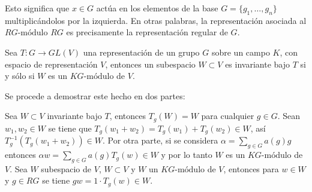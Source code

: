   Esto significa que $x \in G$ actúa en los elementos de la base $G = \{ g_1, \dots, g_n \}$ multiplicándolos por la izquierda. En otras palabras, la representación asociada al $RG\mbox{-módulo}$ $RG$ es precisamente la representación regular de $G$. 
\begin{lema}
  Sea $T \colon G \to GL(V)$ una representación de un grupo $G$ sobre un campo $K$, con espacio de representación $V$, entonces un subespacio $W \subset V$ es invariante bajo $T$ si y sólo si $W$ es un $KG\mbox{-módulo}$ de $V$. 
  \end{lema}
  \begin{proof*}
  Se procede a demostrar este hecho en dos partes:
  \begin{bulletList}
  \newItem Sea $W \subset V$ invariante bajo $T$, entonces $T_{g}(W) = W$ para cualquier $g \in G$. Sean $w_1, w_2 \in W$ se tiene que $T_{g}(w_1 + w_2) = T_{g}(w_1) + T_{g}(w_2) \in W$, así $T_{g}^{-1}(T_{g}(w_1 + w_2)) \in W$. Por otra parte, si se considera $\alpha = \sum_{g \in G}a(g)g$ entonces $\alpha w = \sum_{g \in G}a(g)T_g(w) \in W$ y por lo tanto $W$ es un $KG\mbox{-módulo}$ de~$V$.
  \newItem Sea $W$ subespacio de $V$, $W \subset V$ y $W$ un $KG\mbox{-módulo}$ de $V$, entonces para $w \in W$ y $g \in RG$ se tiene $gw = 1\cdot T_g(w) \in W$. \qedhere
  \end{bulletList} 
  \end{proof*}
  
